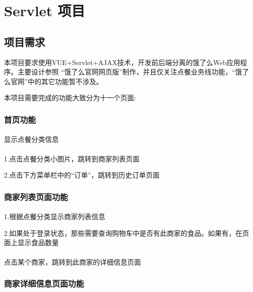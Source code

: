
\chapter{Servlet 项目}

\section{项目需求}

本项目要求使用VUE+Servlet+AJAX技术，开发前后端分离的饿了么Web应用程序。主要设计参照 “饿了么官网网页版”制作，并且仅关注点餐业务线功能，“饿了么官网”中的其它功能暂不涉及。

本项目需要完成的功能大致分为十一个页面:~\\

\subsection{首页功能}
\subsubsection*{}
显示点餐分类信息
\subsubsection*{}
1.点击点餐分类小图片，跳转到商家列表页面

2.点击下方菜单栏中的“订单”，跳转到历史订单页面~\\

\subsection{商家列表页面功能}
\subsubsection*{}
1.根据点餐分类显示商家列表信息

2.如果处于登录状态，那些需要查询购物车中是否有此商家的食品。如果有，在页面上显示食品数量
\subsubsection*{}
点击某个商家，跳转到此商家的详细信息页面~\\

\subsection{商家详细信息页面功能}
